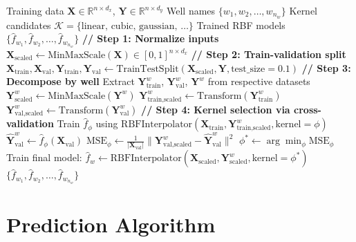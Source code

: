 \documentclass[11pt]{article}
\begin{document}
\begin{algorithm}
\caption{ProxyModelRBF Training}
\begin{algorithmic}[1]
\Require Training data $\mathbf{X} \in \mathbb{R}^{n \times d_x}$, $\mathbf{Y} \in \mathbb{R}^{n \times d_y}$
\Require Well names $\{w_1, w_2, \ldots, w_{n_w}\}$
\Require Kernel candidates $\mathcal{K} = \{\text{linear, cubic, gaussian, }\ldots\}$
\Ensure Trained RBF models $\{\hat{f}_{w_1}, \hat{f}_{w_2}, \ldots, \hat{f}_{w_{n_w}}\}$
\State
\State \textbf{// Step 1: Normalize inputs}
\State $\mathbf{X}_{\text{scaled}} \gets \text{MinMaxScale}(\mathbf{X}) \in [0,1]^{n \times d_x}$
\State
\State \textbf{// Step 2: Train-validation split}
\State $\mathbf{X}_{\text{train}}, \mathbf{X}_{\text{val}}, \mathbf{Y}_{\text{train}}, \mathbf{Y}_{\text{val}} \gets \text{TrainTestSplit}(\mathbf{X}_{\text{scaled}}, \mathbf{Y}, \text{test\_size}=0.1)$
\State
\State \textbf{// Step 3: Decompose by well}
    \State Extract $\mathbf{Y}^w_{\text{train}}$, $\mathbf{Y}^w_{\text{val}}$, $\mathbf{Y}^w$ from respective datasets
    \State $\mathbf{Y}^w_{\text{scaled}} \gets \text{MinMaxScale}(\mathbf{Y}^w)$
    \State $\mathbf{Y}^w_{\text{train,scaled}} \gets \text{Transform}(\mathbf{Y}^w_{\text{train}})$
    \State $\mathbf{Y}^w_{\text{val,scaled}} \gets \text{Transform}(\mathbf{Y}^w_{\text{val}})$
\EndFor
\State
\State \textbf{// Step 4: Kernel selection via cross-validation}
        \State Train $\hat{f}_{\phi}$ using $\text{RBFInterpolator}(\mathbf{X}_{\text{train}}, \mathbf{Y}^w_{\text{train,scaled}}, \text{kernel}=\phi)$
        \State $\hat{\mathbf{Y}}^w_{\text{val}} \gets \hat{f}_{\phi}(\mathbf{X}_{\text{val}})$
        \State $\text{MSE}_{\phi} \gets \frac{1}{|\mathbf{X}_{\text{val}}|} \|\mathbf{Y}^w_{\text{val,scaled}} - \hat{\mathbf{Y}}^w_{\text{val}}\|^2$
    \EndFor
    \State $\phi^* \gets \arg\min_{\phi} \text{MSE}_{\phi}$
    \State Train final model: $\hat{f}_w \gets \text{RBFInterpolator}(\mathbf{X}_{\text{scaled}}, \mathbf{Y}^w_{\text{scaled}}, \text{kernel}=\phi^*)$
\EndFor
\State \Return $\{\hat{f}_{w_1}, \hat{f}_{w_2}, \ldots, \hat{f}_{w_{n_w}}\}$
\end{algorithmic}
\end{algorithm}

\section{Prediction Algorithm}
\end{document}
